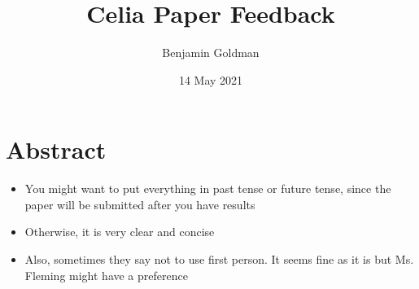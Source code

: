 \documentclass{basic}
\author{Benjamin Goldman}
\date{14 May 2021}
\title{Celia Paper Feedback}
\begin{document}
\maketitle

\section{Abstract}
\label{sec:org9eff226}
\begin{itemize}
\item You might want to put everything in past tense or future tense, since the paper will be submitted after you have results
\item Otherwise, it is very clear and concise
\item Also, sometimes they say not to use first person. It seems fine as it is but Ms. Fleming might have a preference
\end{itemize}
\end{document}
